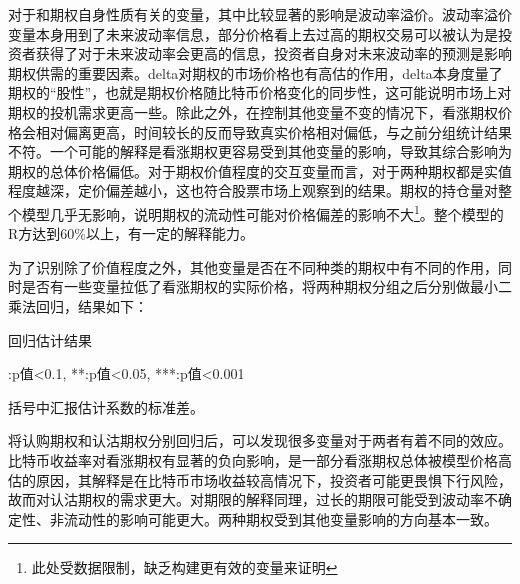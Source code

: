 \par{对于和期权自身性质有关的变量，其中比较显著的影响是波动率溢价。波动率溢价变量本身用到了未来波动率信息，部分价格看上去过高的期权交易可以被认为是投资者获得了对于未来波动率会更高的信息，投资者自身对未来波动率的预测是影响期权供需的重要因素。delta对期权的市场价格也有高估的作用，delta本身度量了期权的“股性”，也就是期权价格随比特币价格变化的同步性，这可能说明市场上对期权的投机需求更高一些。除此之外，在控制其他变量不变的情况下，看涨期权价格会相对偏离更高，时间较长的反而导致真实价格相对偏低，与之前分组统计结果不符。一个可能的解释是看涨期权更容易受到其他变量的影响，导致其综合影响为期权的总体价格偏低。对于期权价值程度的交互变量而言，对于两种期权都是实值程度越深，定价偏差越小，这也符合股票市场上观察到的结果。期权的持仓量对整个模型几乎无影响，说明期权的流动性可能对价格偏差的影响不大\footnote{此处受数据限制，缺乏构建更有效的变量来证明}。整个模型的R方达到60$\%$以上，有一定的解释能力。}
\par{为了识别除了价值程度之外，其他变量是否在不同种类的期权中有不同的作用，同时是否有一些变量拉低了看涨期权的实际价格，将两种期权分组之后分别做最小二乘法回归，结果如下：}
\newpage
{}
\begin{center}
    \begin{threeparttable}[H]

        \caption{回归估计结果}

        
        \begin{tablenotes}
            \footnotesize
            \item *:p值<0.1, **:p值<0.05, ***:p值<0.001
            \item 括号中汇报估计系数的标准差。
        \end{tablenotes}
    \end{threeparttable}
\end{center}
\newpage
\restoregeometry
将认购期权和认沽期权分别回归后，可以发现很多变量对于两者有着不同的效应。比特币收益率对看涨期权有显著的负向影响，是一部分看涨期权总体被模型价格高估的原因，其解释是在比特币市场收益较高情况下，投资者可能更畏惧下行风险，故而对认沽期权的需求更大。对期限的解释同理，过长的期限可能受到波动率不确定性、非流动性的影响可能更大。两种期权受到其他变量影响的方向基本一致。